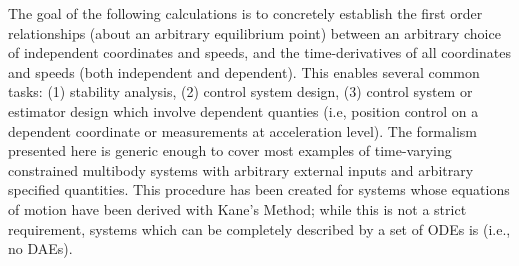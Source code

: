 \documentclass{svjour3}                     %
\begin{document}
The goal of the following calculations is to concretely establish the first
order relationships (about an arbitrary equilibrium point) between an arbitrary
choice of independent coordinates and speeds, and the time-derivatives of all
coordinates and speeds (both independent and dependent).  This enables several
common tasks: (1) stability analysis, (2) control system design, (3) control
system or estimator design which involve dependent quanties (i.e, position
control on a dependent coordinate or measurements at acceleration level).  The
formalism presented here is generic enough to cover most examples of
time-varying constrained multibody systems with arbitrary external inputs and
arbitrary specified quantities.  This procedure has been created for systems
whose equations of motion have been derived with Kane's Method; while this is
not a strict requirement, systems which can be completely described by a set of
ODEs is (i.e., no DAEs).
\end{document}
